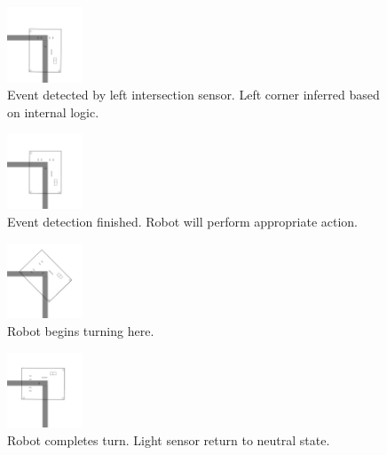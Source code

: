 \begin{multicols}{4}

\begin{figure}[H]
\centering
\includegraphics[width=0.2\textwidth]{figures/corner-1.png}
\caption{Event detected by left intersection sensor. Left corner inferred based on internal logic.}
\end{figure}

\begin{figure}[H]
\centering
\includegraphics[width=0.2\textwidth]{figures/corner-2.png}
\caption{Event detection finished. Robot will perform appropriate action.}
\end{figure}

\begin{figure}[H]
\centering
\includegraphics[width=0.2\textwidth]{figures/corner-3.png}
\caption{Robot begins turning here.}
\end{figure}

\begin{figure}[H]
\centering
\includegraphics[width=0.2\textwidth]{figures/corner-4.png}
\caption{Robot completes turn. Light sensor return to neutral state.}
\end{figure}

\end{multicols}

